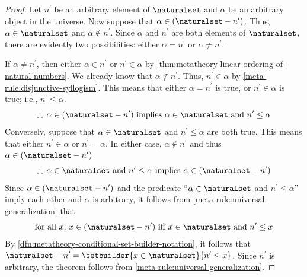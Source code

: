 \begin{proof}
    Let \( n^{\prime} \) be an arbitrary element of \( \naturalset \) and \( \alpha \) be an arbitrary object in the universe.
    Now suppose that \( \alpha \in \mleft( \naturalset - n^{\prime} \mright) \).
    Thus, \( \alpha \in \naturalset \) and \( \alpha \notin n^{\prime} \).
    Since \( \alpha \) and \( n^{\prime} \) are both elements of \( \naturalset \), there are evidently two possibilities: either \( \alpha = n^{\prime} \)
    or \( \alpha \neq n^{\prime} \).

    \vspace{0.3cm}
    \noindent
    If \( \alpha \neq n^{\prime} \), then either \( \alpha \in n^{\prime} \) or \( n^{\prime} \in \alpha \) by \cref{thm:metatheory-linear-ordering-of-natural-numbers}.
    We already know that \( \alpha \notin n^{\prime} \). Thus, \( n^{\prime} \in \alpha \) by \cref{meta-rule:disjunctive-syllogism}.
    This means that either \( \alpha = n^{\prime} \) is true, or \( n^{\prime} \in \alpha \) is true; i.e., \( n^{\prime} \leq \alpha \).
    \begin{equation*}
        \therefore \, \alpha \in \mleft( \naturalset - n^{\prime} \mright) \ \text{implies} \ \alpha \in \naturalset \ \text{and} \ n^{\prime} \leq \alpha
    \end{equation*}
    Conversely, suppose that \( \alpha \in \naturalset \) and \( n^{\prime} \leq \alpha \) are both true.
    This means that either \( n^{\prime} \in \alpha \) or \( n^{\prime} = \alpha \).
    In either case, \( \alpha \notin n^{\prime} \) and thus \( \alpha \in \mleft( \naturalset - n^{\prime} \mright) \).
    \begin{equation*}
        \therefore \, \alpha \in \naturalset \ \text{and} \ n^{\prime} \leq \alpha \ \text{implies} \ \alpha \in \mleft( \naturalset - n^{\prime} \mright)
    \end{equation*}
    Since \( \alpha \in \mleft( \naturalset - n^{\prime} \mright) \) and the predicate ``\( \alpha \in \naturalset \) and \( n^{\prime} \leq \alpha \)'' imply
    each other and \( \alpha \) is arbitrary, it follows from \cref{meta-rule:universal-generalization} that
    \begin{equation*}
        \text{for all \( x \), \( x \in \mleft( \naturalset - n^{\prime} \mright) \) iff \( x \in \naturalset \) and \( n^{\prime} \leq x \)}
    \end{equation*}
    By \cref{dfn:metatheory-conditional-set-builder-notation}, it follows that
    \( \naturalset - n^{\prime} = \setbuilder{x \in \naturalset}{n^{\prime} \leq x} \).
    Since \( n^{\prime} \) is arbitrary, the theorem follows from \cref{meta-rule:universal-generalization}.
\end{proof}


